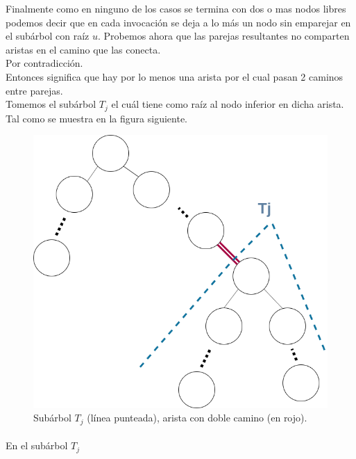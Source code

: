 \documentclass[12pt]{article}
\begin{document}
Finalmente como en ninguno de los casos se termina con dos o mas nodos libres podemos decir que en cada invocación se deja a lo más un nodo sin emparejar  en el subárbol con raíz $u$.
Probemos ahora que las parejas resultantes no comparten aristas en el camino que las conecta.\\
Por contradicción.\\
Entonces significa que hay por lo menos una arista por el cual pasan 2 caminos entre parejas. \\
Tomemos el subárbol $T_j$ el cuál tiene como raíz al nodo inferior en dicha arista. Tal como se muestra en la figura siguiente.\\
\begin{figure}[h]
\begin{center}
\includegraphics[scale=0.5]{ARBOL}
	\end{center}
\caption{Subárbol $T_j$ (línea punteada), arista con doble camino (en rojo).}
\end{figure}
\pagebreak
\paragraph{} En el subárbol $T_j$
\end{document}
